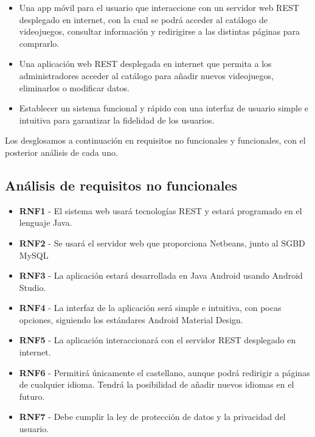 \documentclass[11pt, spanish]{article}
\begin{document}
\begin{itemize}
\item Una app móvil para el usuario que interaccione con un servidor web REST desplegado en internet, con la cual se podrá acceder al catálogo de videojuegos, consultar información y redirigirse a las distintas páginas para comprarlo.

\item Una aplicación web REST desplegada en internet que permita a los administradores acceder al catálogo para añadir nuevos videojuegos, eliminarlos o modificar datos.

\item Establecer un sistema funcional y rápido con una interfaz de usuario simple e intuitiva para garantizar la fidelidad de los usuarios.
\end{itemize}

Los desglosamos a continuación en requisitos no funcionales y funcionales, con el posterior análisis de cada uno.

\subsection{Análisis de requisitos no funcionales}

\begin{itemize}
\item \textbf{RNF1} - El sistema web usará tecnologías REST y estará programado en el lenguaje Java.

\item \textbf{RNF2} - Se usará el servidor web que proporciona Netbeans, junto al SGBD MySQL

\item \textbf{RNF3} - La aplicación estará desarrollada en Java Android usando Android Studio.

\item \textbf{RNF4} - La interfaz de la aplicación será simple e intuitiva, con pocas opciones, siguiendo los estándares Android Material Design.

\item \textbf{RNF5} - La aplicación interaccionará con el servidor REST desplegado en internet.

\item \textbf{RNF6} - Permitirá únicamente el castellano, aunque podrá redirigir a páginas de cualquier idioma. Tendrá la posibilidad de añadir nuevos idiomas en el futuro.

\item \textbf{RNF7} - Debe cumplir la ley de protección de datos y la privacidad del usuario.
\end{itemize}
\end{document}
